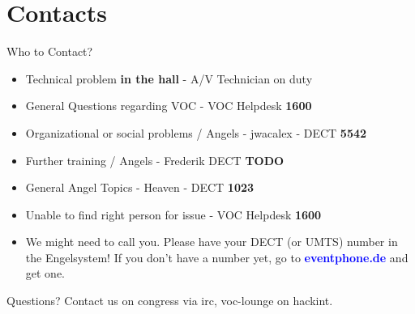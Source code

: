 \documentclass[aspectratio=169]{beamer}
\begin{document}
\section{Contacts}			%
\begin{frame}{Who to Contact?}
\begin{itemize}
	\item Technical problem \textbf{in the hall} - A/V Technician on duty
	\item General Questions regarding VOC - VOC Helpdesk \textbf{1600}
	\item Organizational or social problems / Angels - jwacalex - DECT \textbf{5542}
	\item Further training / Angels - Frederik DECT \textbf{TODO}
	\item General Angel Topics - Heaven - DECT \textbf{1023}
	\item Unable to find right person for issue - VOC Helpdesk \textbf{1600}
	\item We might need to call you. Please have your DECT (or UMTS) number in the Engelsystem! If you don't have a number yet, go to 
	\textcolor{blue}{\textbf{eventphone.de}} and get one. 
\end{itemize} 
\end{frame}

\begin{frame}{Questions?}
Contact us on congress via irc, voc-lounge on hackint.
\end{frame}
\end{document}
